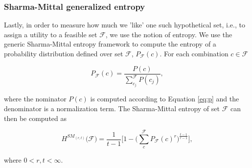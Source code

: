 \documentclass[12pt]{article}
\begin{document}
\subsubsection{Sharma-Mittal generalized entropy}

Lastly, in order to measure how much we 'like' one such hypothetical set, i.e., to assign a utility to a feasible set $\mathcal{F}$, we use the notion of entropy. We use the generic Sharma-Mittal entropy framework to compute the entropy of a probability distribution defined over set $\mathcal{F}$, $P_{\mathcal{F}}(c)$. For each combination $c \in \mathcal{F}$

\begin{equation*}
P_{\mathcal{F}}(c) = \frac{P(c)}{\sum_{c_j}^{\mathcal{F}} P(c_j)},
\end{equation*}

where the nominator $P(c)$ is computed according to Equation \ref{eq:p} and the denominator is a normalization term. The Sharma-Mittal entropy of set $\mathcal{F}$ can then be computed as 

\begin{equation*}
H^{SM_{(r,t)}}\big( {\mathcal{F}} \big)=\frac{1}{t-1}\Bigg[ 1-\bigg(\sum_{c}^{\mathcal{F}} P_{\mathcal{F}}(c)^r \bigg)^{\frac{t-1}{r-1}} \Bigg],
\end{equation*}

where $0 < r,t < \infty$.

%
%
%
%
%
%
\end{document}
